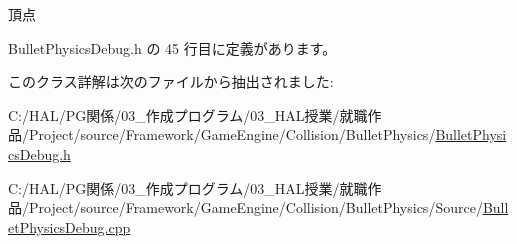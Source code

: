 頂点 



 Bullet\+Physics\+Debug.\+h の 45 行目に定義があります。



このクラス詳解は次のファイルから抽出されました\+:\begin{DoxyCompactItemize}
\item 
C\+:/\+H\+A\+L/\+P\+G関係/03\+\_\+作成プログラム/03\+\_\+\+H\+A\+L授業/就職作品/\+Project/source/\+Framework/\+Game\+Engine/\+Collision/\+Bullet\+Physics/\mbox{\hyperlink{_bullet_physics_debug_8h}{Bullet\+Physics\+Debug.\+h}}\item 
C\+:/\+H\+A\+L/\+P\+G関係/03\+\_\+作成プログラム/03\+\_\+\+H\+A\+L授業/就職作品/\+Project/source/\+Framework/\+Game\+Engine/\+Collision/\+Bullet\+Physics/\+Source/\mbox{\hyperlink{_bullet_physics_debug_8cpp}{Bullet\+Physics\+Debug.\+cpp}}\end{DoxyCompactItemize}
